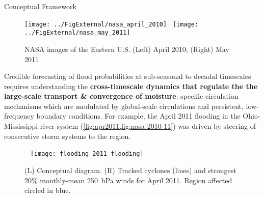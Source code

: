 \begin{block}{Conceptual Framework}
    \begin{figure}
        \texttt{[image: ../FigExternal/nasa\_april\_2010]}~
        \texttt{[image: ../FigExternal/nasa\_may\_2011]}
        \caption{NASA images of the Eastern U.S. (Left) April 2010; (Right) May 2011}
        \label{fig:nasa-2010-11}
    \end{figure}
    Credible forecasting of flood probabilities at sub-seasonal to decadal timescales \cite{Merz2014} requires understanding the \textbf{cross-timescale dynamics that regulate the the large-scale transport \& convergence of moisture}: specific circulation mechanisms which are modulated by global-scale circulations and persistent, low-frequency boundary conditions.
    For example, the April 2011 flooding in the Ohio-Mississippi river system (\cref{fig:apr2011,fig:nasa-2010-11}) was driven by steering of consecutive storm systems to the region.
    \begin{figure}
        ~\hfill
        \texttt{[image: flooding\_2011\_flooding]}
        \caption{(L) Conceptual diagram. (R) Tracked cyclones (lines) and strongest 20\% monthly-mean \SI{250}{\hecto\pascal} winds for April 2011. Region affected circled in blue.}
        \label{fig:apr2011}
    \end{figure}
\end{block}
